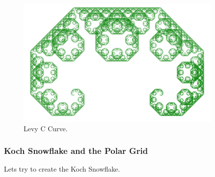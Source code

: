             \begin{figure}[ht]
                \caption{\label{levyc02} Levy C Curve.}
                \centering
                \includegraphics[width=0.9\textwidth]{img/levyc02.png}
            \end{figure}

            \FloatBarrier

        \subsubsection{Koch Snowflake and the Polar Grid}

            Lets try to create the Koch Snowflake.

